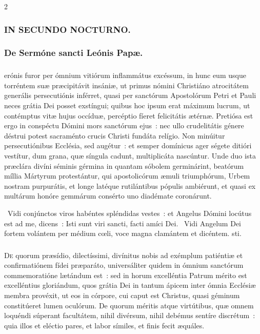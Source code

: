 \documentclass[9pt,twoside]{extarticle}
\begin{document}
\begin{multicols}{2}
{{{\subsubsection*{\center \textsc{IN SECUNDO NOCTURNO.}}
\subsubsection*{\center De Sermóne sancti Leónis Papæ.}
\subsubsection*{\center {}}
erónis furor per ómnium vitiórum inflammátus excéssum, in hunc eum usque torréntem suæ præcipitávit insániæ, ut primus nómini Christiáno atrocitátem generális persecutiónis inférret, quasi per sanctórum Apostolórum Petri et Pauli neces grátia Dei posset exstíngui; quibus hoc ipsum erat máximum lucrum, ut contémptus vitæ hujus occíduæ, percéptio fíeret felicitátis ætérnæ. Pretiósa est ergo in conspéctu Dómini mors sanctórum ejus~: nec ullo crudelitátis génere déstrui potest sacraménto crucis Christi fundáta relígio. Non minúitur persecutiónibus Ecclésia, sed augétur~: et semper domínicus ager ségete ditióri vestítur, dum grana, quæ síngula cadunt, multiplicáta nascúntur. Unde duo ista præclára divíni séminis gérmina in quantam sóbolem germinárint, beatórum míllia Mártyrum protestántur, qui apostolicórum æmuli triumphórum, Urbem nostram purpurátis, et longe latéque rutilántibus pópulis ambiérunt, et quasi ex multárum honóre gemmárum consérto uno diadémate coronárunt.

\begin{tightlist}{}
\item {}~Vidi conjúnctos viros habéntes spléndidas vestes~: et Angelus Dómini locútus est ad me, dicens~: \textred{*} Isti sunt viri sancti, facti amíci Dei. ~Vidi Angelum Dei fortem volántem per médium cœli, voce magna clamántem et dicéntem. sti.
\end{tightlist}

\subsubsection*{\center {}}
\lettrine{D}e quorum præsídio, dilectíssimi, divínitus nobis ad exémplum patiéntiæ et confirmatiónem fídei præparáto, universáliter quidem in ómnium sanctórum commemoratióne lætándum est~: sed in horum excelléntia Patrum mérito est excelléntius gloriándum, quos grátia Dei in tantum ápicem inter ómnia Ecclésiæ membra provéxit, ut eos in córpore, cui caput est Christus, quasi géminum constitúeret lumen oculórum. De quorum méritis atque virtútibus, quæ omnem loquéndi súperant facultátem, nihil divérsum, nihil debémus sentíre discrétum~: quia illos et eléctio pares, et labor símiles, et finis fecit æquáles.

}}}
\end{multicols}
\end{document}
